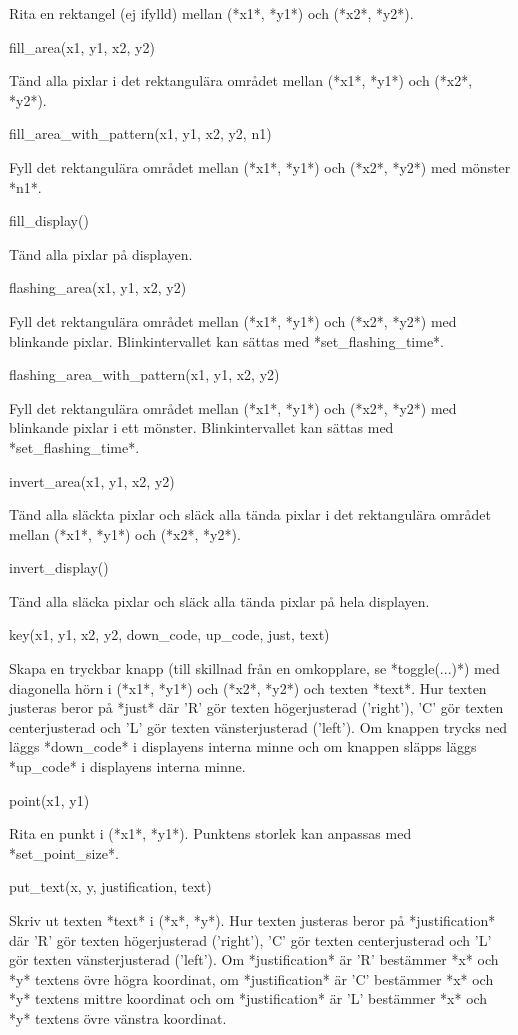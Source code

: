 \documentclass[10pt,oneside,swedish]{lips-no_customer}
\begin{document}
Rita en rektangel (ej ifylld) mellan (*x1*, *y1*) och (*x2*, *y2*).

fill\_area(x1, y1, x2, y2)

Tänd alla pixlar i det rektangulära området mellan (*x1*, *y1*) och
(*x2*, *y2*).

fill\_area\_with\_pattern(x1, y1, x2, y2, n1)

Fyll det rektangulära området mellan (*x1*, *y1*) och (*x2*, *y2*) med
mönster *n1*.

fill\_display()

Tänd alla pixlar på displayen.

flashing\_area(x1, y1, x2, y2)

Fyll det rektangulära området mellan (*x1*, *y1*) och (*x2*, *y2*) med
blinkande pixlar. Blinkintervallet kan sättas med *set\_flashing\_time*.

flashing\_area\_with\_pattern(x1, y1, x2, y2)

Fyll det rektangulära området mellan (*x1*, *y1*) och (*x2*, *y2*) med
blinkande pixlar i ett mönster. Blinkintervallet kan sättas med
*set\_flashing\_time*.

invert\_area(x1, y1, x2, y2)

Tänd alla släckta pixlar och släck alla tända pixlar i det rektangulära
området mellan (*x1*, *y1*) och (*x2*, *y2*).

invert\_display()

Tänd alla släcka pixlar och släck alla tända pixlar på hela displayen.

key(x1, y1, x2, y2, down\_code, up\_code, just, text)

Skapa en tryckbar knapp (till skillnad från en omkopplare, se
*toggle(...)*) med diagonella hörn i (*x1*, *y1*) och (*x2*, *y2*) och
texten *text*. Hur texten justeras beror på *just* där 'R' gör texten
högerjusterad ('right'), 'C' gör texten centerjusterad och 'L' gör
texten vänsterjusterad ('left'). Om knappen trycks ned läggs
*down\_code* i displayens interna minne och om knappen släpps läggs
*up\_code* i displayens interna minne.

point(x1, y1)

Rita en punkt i (*x1*, *y1*). Punktens storlek kan anpassas med
*set\_point\_size*.

put\_text(x, y, justification, text)

Skriv ut texten *text* i (*x*, *y*). Hur texten justeras beror på
*justification* där 'R' gör texten högerjusterad ('right'), 'C' gör
texten centerjusterad och 'L' gör texten vänsterjusterad ('left'). Om
*justification* är 'R' bestämmer *x* och *y* textens övre högra
koordinat, om *justification* är 'C' bestämmer *x* och *y* textens
mittre koordinat och om *justification* är 'L' bestämmer *x* och *y*
textens övre vänstra koordinat.
\end{document}
